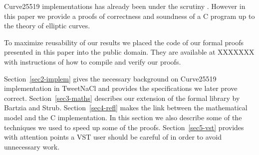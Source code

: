Curve25519 implementations has already been under the scrutiny \cite{Chen2014VerifyingCS}.
However in this paper we provide a proofs of correctness and soundness of a C program up to
the theory of elliptic curves.


To maximize reusability of our results we placed the code of our formal proofs
presented in this paper into the public domain. They are available at XXXXXXX
with instructions of how to compile and verify our proofs.

Section~\ref{sec2-implem} gives the necessary background on Curve25519
implementation in TweetNaCl and provides the specifications we later prove correct.
Section~\ref{sec3-maths} describes our extension of the formal library by Bartzia and Strub.
Section~\ref{sec4-refl} makes the link between the mathematical model and the C implementation.
In this section we also describe some of the techniques we used to speed up some of the proofs.
Section~\ref{sec5-vst} provides with attention points a VST user should be careful
of in order to avoid unnecessary work.



%
%

